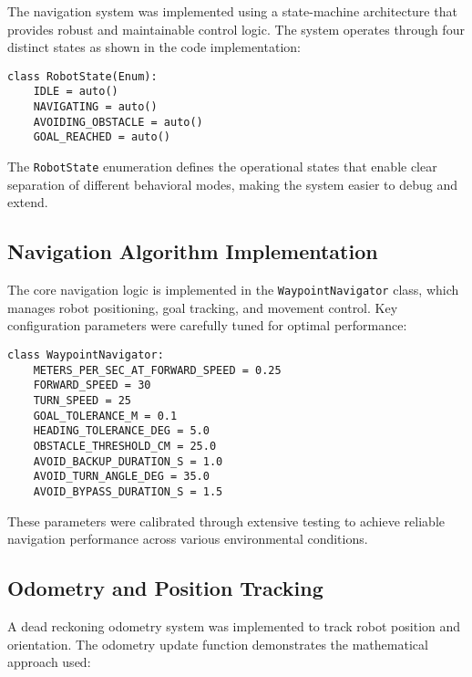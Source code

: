 \documentclass{book}
\begin{document}
\par\noindent The navigation system was implemented using a state-machine architecture that provides robust and maintainable control logic. The system operates through four distinct states as shown in the code implementation:

\begin{lstlisting}[style=pythonstyle, caption={State Machine Enumeration}]
class RobotState(Enum):
    IDLE = auto()
    NAVIGATING = auto()
    AVOIDING_OBSTACLE = auto()
    GOAL_REACHED = auto()
\end{lstlisting}

\par\noindent The \texttt{RobotState} enumeration defines the operational states that enable clear separation of different behavioral modes, making the system easier to debug and extend.

\subsection{Navigation Algorithm Implementation}

\par\noindent The core navigation logic is implemented in the \texttt{WaypointNavigator} class, which manages robot positioning, goal tracking, and movement control. Key configuration parameters were carefully tuned for optimal performance:

\begin{lstlisting}[style=pythonstyle, caption={Navigation System Configuration}]
class WaypointNavigator:
    METERS_PER_SEC_AT_FORWARD_SPEED = 0.25
    FORWARD_SPEED = 30
    TURN_SPEED = 25
    GOAL_TOLERANCE_M = 0.1
    HEADING_TOLERANCE_DEG = 5.0
    OBSTACLE_THRESHOLD_CM = 25.0
    AVOID_BACKUP_DURATION_S = 1.0
    AVOID_TURN_ANGLE_DEG = 35.0
    AVOID_BYPASS_DURATION_S = 1.5
\end{lstlisting}

\par\noindent These parameters were calibrated through extensive testing to achieve reliable navigation performance across various environmental conditions.

\subsection{Odometry and Position Tracking}

\par\noindent A dead reckoning odometry system was implemented to track robot position and orientation. The odometry update function demonstrates the mathematical approach used:
\end{document}
